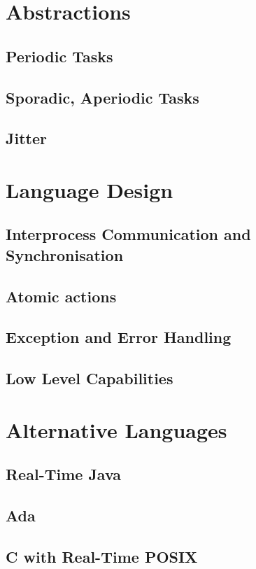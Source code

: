 \section{Abstractions}
\subsection{Periodic Tasks}
\subsection{Sporadic, Aperiodic Tasks}
\subsection{Jitter}

\section{Language Design}
\subsection{Interprocess Communication and Synchronisation}
\subsection{Atomic actions}
\subsection{Exception and Error Handling}
\subsection{Low Level Capabilities}

\section{Alternative Languages}
\subsection{Real-Time Java}
\subsection{Ada}
\subsection{C with Real-Time POSIX}

